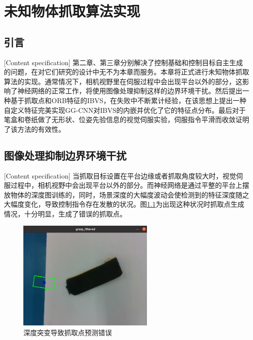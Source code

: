 \documentclass[fontset=fandol,type=bachelor,campus=harbin,bsmainpagenumberline=true]{hithesisbook}
\begin{document}
\chapter[未知物体抓取算法实现]{未知物体抓取算法实现}
\section{引言}[Content specification]
第二章、第三章分别解决了控制基础和控制目标自主生成的问题，在对它们研究的设计中无不为本章而服务。本章将正式进行未知物体抓取算法的实现。通常情况下，相机视野里在伺服过程中会出现平台以外的部分，这影响了神经网络的正常工作，将使用图像处理抑制这样的边界环境干扰。然后提出一种基于抓取点和ORB特征的IBVS，在失败中不断累计经验，在该思想上提出一种自定义特征完美实现GG-CNN对IBVS的内嵌并优化了它的特征点分布。最后对于笔盒和卷纸做了无形状、位姿先验信息的视觉伺服实验，伺服指令平滑而收敛证明了该方法的有效性。

\section{图像处理抑制边界环境干扰}[Content specification]
当抓取目标设置在平台边缘或者抓取角度较大时，视觉伺服过程中，相机视野中会出现平台以外的部分。而神经网络是通过平整的平台上摆放物体的深度图训练的，同时，场景深度的大幅度波动会使检测到的特征深度随之大幅度变化，导致控制指令存在发散的状况。图\ref{深度突变导致抓取点预测错误}为出现这种状况时抓取点生成情况，十分明显，生成了错误的抓取点。
\begin{figure}[h]
\centering
\includegraphics[width = 0.6\textwidth]{chapter4/深度突变导致抓取点预测错误}
\caption{深度突变导致抓取点预测错误}
\label{深度突变导致抓取点预测错误}
\end{figure}
\end{document}
